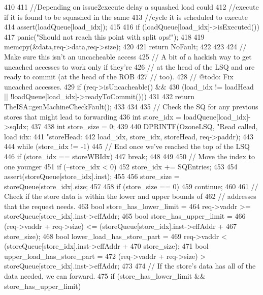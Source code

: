 \begin{DoxyCode}
410 {
411     //Depending on issue2execute delay a squashed load could
412     //execute if it is found to be squashed in the same
413     //cycle it is scheduled to execute
414     assert(loadQueue[load_idx]);
415 
416     if (loadQueue[load_idx]->isExecuted()) {
417         panic("Should not reach this point with split ops!");
418 
419         memcpy(&data,req->data,req->size);
420 
421         return NoFault;
422     }
423 
424     // Make sure this isn't an uncacheable access
425     // A bit of a hackish way to get uncached accesses to work only if they're
426     // at the head of the LSQ and are ready to commit (at the head of the ROB
427     // too).
428     // @todo: Fix uncached accesses.
429     if (req->isUncacheable() &&
430         (load_idx != loadHead || !loadQueue[load_idx]->readyToCommit())) {
431 
432         return TheISA::genMachineCheckFault();
433     }
434 
435     // Check the SQ for any previous stores that might lead to forwarding
436     int store_idx = loadQueue[load_idx]->sqIdx;
437 
438     int store_size = 0;
439 
440     DPRINTF(OzoneLSQ, "Read called, load idx: %
441             "storeHead: %
442             load_idx, store_idx, storeHead, req->paddr);
443 
444     while (store_idx != -1) {
445         // End once we've reached the top of the LSQ
446         if (store_idx == storeWBIdx) {
447             break;
448         }
449 
450         // Move the index to one younger
451         if (--store_idx < 0)
452             store_idx += SQEntries;
453 
454         assert(storeQueue[store_idx].inst);
455 
456         store_size = storeQueue[store_idx].size;
457 
458         if (store_size == 0)
459             continue;
460 
461         // Check if the store data is within the lower and upper bounds of
462         // addresses that the request needs.
463         bool store_has_lower_limit =
464             req->vaddr >= storeQueue[store_idx].inst->effAddr;
465         bool store_has_upper_limit =
466             (req->vaddr + req->size) <= (storeQueue[store_idx].inst->effAddr +
467                                          store_size);
468         bool lower_load_has_store_part =
469             req->vaddr < (storeQueue[store_idx].inst->effAddr +
470                            store_size);
471         bool upper_load_has_store_part =
472             (req->vaddr + req->size) > storeQueue[store_idx].inst->effAddr;
473 
474         // If the store's data has all of the data needed, we can forward.
475         if (store_has_lower_limit && store_has_upper_limit) {
}}}
\end{DoxyCode}
